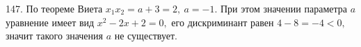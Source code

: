 147. По теореме Виета $x_1x_2=a+3=2,\ a=-1.$ При этом значении параметра $a$ уравнение имеет вид $x^2-2x+2=0,$ его дискриминант равен $4-8=-4<0,$ значит такого значения $a$ не существует.
\newpage
